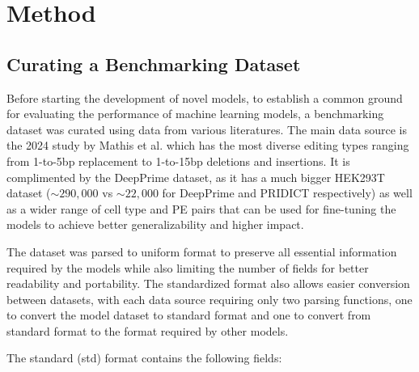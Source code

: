 \chapter{Method}

\minitoc

\section{Curating a Benchmarking Dataset}

\label{sec:datasets}

Before starting the development of novel models, to establish a common ground for evaluating the performance of machine learning models, a benchmarking dataset was curated using data from various literatures. The main data source is the 2024 study by Mathis et al. which has the most diverse editing types ranging from 1-to-5bp replacement to 1-to-15bp deletions and insertions\cite{mathisMachineLearningPrediction2024}. It is complimented by the DeepPrime dataset, as it has a much bigger HEK293T dataset ($\sim290,000$ vs $\sim22,000$ for DeepPrime and PRIDICT respectively) as well as a wider range of cell type and PE pairs that can be used for fine-tuning the models to achieve better generalizability and higher impact\cite{yuPredictionEfficienciesDiverse2023}. 

The dataset was parsed to uniform format to preserve all essential information required by the models while also limiting the number of fields for better readability and portability. The standardized format also allows easier conversion between datasets, with each data source requiring only two parsing functions, one to convert the model dataset to standard format and one to convert from standard format to the format required by other models. 

The standard (std) format contains the following fields:

